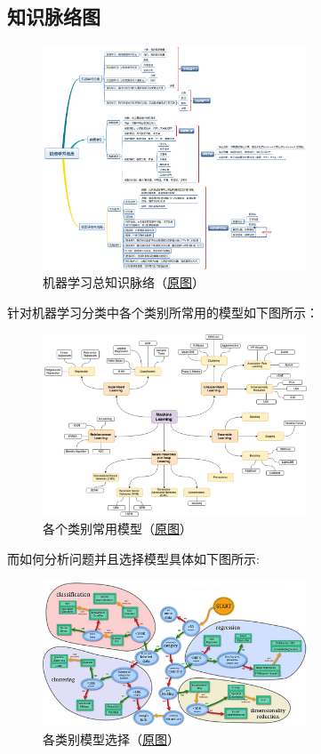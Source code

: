 \documentclass[lang=cn,11pt,a4paper]{elegant_template}
\begin{document}
\subsection{知识脉络图}
\begin{figure}[htbp]
  \centering
  \includegraphics[width=0.7\textwidth]{image/ML-1.png}
  \caption{机器学习总知识脉络（\href{https://www.cnblogs.com/wnwin/p/9684520.html}{原图}）}
\end{figure}
针对机器学习分类中各个类别所常用的模型如下图所示：
\begin{figure}[htbp]
  \centering
  \vspace{0cm}
  \includegraphics[width=0.7\textwidth]{image/ML-2.png}
  \caption{各个类别常用模型（\href{https://github.com/trekhleb/machine-learning-octave}{原图}）}
\end{figure}

而如何分析问题并且选择模型具体如下图所示:
\begin{figure}[htbp]
  \centering
  \includegraphics[width=0.7\textwidth]{image/ML-3.png}
  \caption{各类别模型选择（\href{https://scikit-learn.org/stable/tutorial/machine_learning_map/index.html}{原图}）}
\end{figure}
\end{document}
